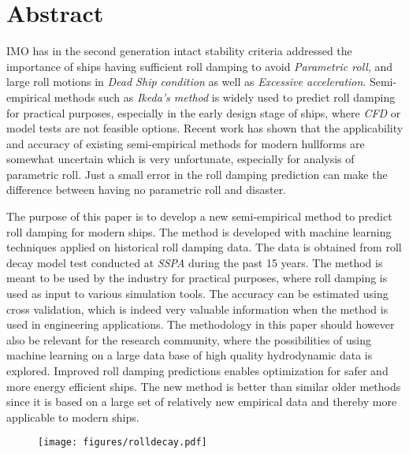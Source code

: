 \section{Abstract}
\label{se:abstract}
IMO has in the second generation intact stability criteria addressed the importance of ships having sufficient roll damping to avoid \emph{Parametric roll}, and large roll motions in \emph{Dead Ship condition} as well as \emph{Excessive acceleration}. Semi-empirical methods such as \emph{Ikeda's method} is widely used to predict roll damping for practical purposes, especially in the early design stage of ships, where \emph{CFD} or model tests are not feasible options. Recent work has shown that the applicability and accuracy of existing semi-empirical methods for modern hullforms are somewhat uncertain which is very unfortunate, especially for analysis of parametric roll. Just a small error in the roll damping prediction can make the difference between having no parametric roll and disaster.

The purpose of this paper is to develop a new semi-empirical method to predict roll damping for modern ships. The method is developed with machine learning techniques applied on historical roll damping data. The data is obtained from roll decay model test conducted at \emph{SSPA} during the past 15 years. The method is meant to be used by the industry for practical purposes, where roll damping is used as input to various simulation tools. The accuracy can be estimated using cross validation, which is indeed very valuable information when the method is used in engineering applications. The methodology in this paper should however also be relevant for the research community, where the possibilities of using machine learning on a large data base of high quality hydrodynamic data is explored. Improved roll damping predictions enables optimization for safer and more energy efficient ships.
The new method is better than similar older methods since it is based on a large set of relatively new empirical data and thereby more applicable to modern ships.

\vspace*{-0.07in}
\begin{figure}[h]
  \centering
  \texttt{[image: figures/rolldecay.pdf]}
\end{figure}
\vspace*{-0.6in}
\newpage 